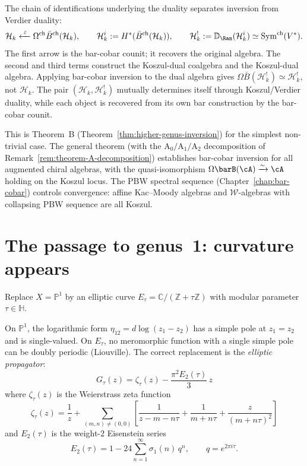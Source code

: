 The chain of identifications underlying the duality separates
inversion from Verdier duality:
\[
\mathcal H_k
\xleftarrow{\;\varepsilon\;}
\Omega^{\mathrm{ch}}\bar B^{\mathrm{ch}}(\mathcal H_k),
\qquad
\mathcal H_k^i:=H^*(\bar B^{\mathrm{ch}}(\mathcal H_k)),
\qquad
\mathcal H_k^!:=\mathbb{D}_{\Ran}(\mathcal H_k^i)
\simeq \mathrm{Sym}^{\mathrm{ch}}(V^*).
\]
The first arrow is the bar-cobar counit; it recovers the
original algebra. The second and third terms construct the
Koszul-dual coalgebra and the Koszul-dual algebra. Applying
bar-cobar inversion to the dual algebra gives
$\Omega\bar B(\mathcal H_k^!)\simeq \mathcal H_k^!$, not
$\mathcal H_k$. The pair
$(\mathcal{H}_k,\mathcal{H}_k^!)$ mutually determines itself
through Koszul/Verdier duality, while each object is recovered
from its own bar construction by the bar-cobar counit.

This is Theorem~B
(Theorem~\ref{thm:higher-genus-inversion})
for the simplest non-trivial case. The general theorem
(with the $\mathrm{A}_0/\mathrm{A}_1/\mathrm{A}_2$ decomposition
of Remark~\ref{rem:theorem-A-decomposition}) establishes
bar-cobar inversion for all augmented chiral algebras, with the
quasi-isomorphism $\Omega\barB(\cA) \xrightarrow{\sim}
\cA$ holding on the Koszul locus. The PBW spectral sequence
(Chapter~\ref{chap:bar-cobar}) controls convergence:
affine Kac--Moody algebras and $\mathcal{W}$-algebras with
collapsing PBW sequence are all Koszul.

\section{The passage to genus~1: curvature appears}
\label{sec:frame-genus1}

Replace $X = \mathbb{P}^1$ by an elliptic curve
$E_\tau = \mathbb{C}/(\mathbb{Z} + \tau\mathbb{Z})$ with modular
parameter $\tau \in \mathbb{H}$.

On $\mathbb{P}^1$, the logarithmic form
$\eta_{12} = d\log(z_1 - z_2)$ has a simple pole at $z_1 = z_2$ and is
single-valued. On $E_\tau$, no meromorphic function with a single
simple pole can be doubly periodic (Liouville). The correct
replacement is the \emph{elliptic propagator}:
\begin{equation}\label{eq:frame-elliptic-propagator}
G_\tau(z) = \zeta_\tau(z) - \frac{\pi^2 E_2(\tau)}{3}\, z
\end{equation}
where $\zeta_\tau(z)$ is the Weierstrass zeta function
\begin{equation}\label{eq:frame-weierstrass-zeta}
\zeta_\tau(z) = \frac{1}{z}
+ \sum_{(m,n) \neq (0,0)}\left[
 \frac{1}{z - m - n\tau}
 + \frac{1}{m + n\tau}
 + \frac{z}{(m+n\tau)^2}
\right]
\end{equation}
and $E_2(\tau)$ is the weight-$2$ Eisenstein series
\begin{equation}\label{eq:frame-E2}
E_2(\tau) = 1 - 24\sum_{n=1}^{\infty} \sigma_1(n)\, q^n,
\qquad q = e^{2\pi i \tau}.
\end{equation}

